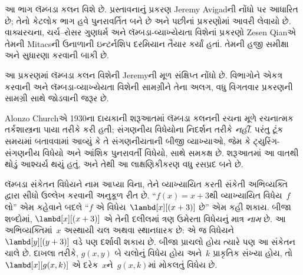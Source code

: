 
\label{guunit:OLP-0341}


\begin{editorial}
આ ભાગ લૅમ્બડા કલન વિશે છે. પ્રસ્તાવનાનું પ્રકરણ Jeremy Avigadની
નોંધો પર આધારિત છે; તેનો કેટલોક ભાગ હવે પુનરાવર્તિત બને છે અને પછીનાં
પ્રકરણોમાં આવરી લેવાયો છે. વાક્યરચના, ચર્ચ--રોસર ગુણધર્મ અને
લૅમ્બડા-વ્યાખ્યેયતા વિશેનાં પ્રકરણો Zesen Qianએ તેમની Mitacsની
ઉનાળાની ઇન્ટર્નશિપ દરમિયાન તૈયાર કર્યાં હતાં. તેમની હજી સમીક્ષા
અને સુધારણા કરવાની બાકી છે.
\end{editorial}

\begingroup
\makeatletter{}\makeatother

\label{guunit:OLP-0342}


\begin{editorial}
આ પ્રકરણમાં લૅમ્બડા કલન વિશેની Jeremyની મૂળ સંક્ષિપ્ત નોંધો છે.
વિભાગોને એકત્ર કરવાની અને લૅમ્બડા-વ્યાખ્યેયતા વિશેની સામગ્રીને
તેના અલગ, વધુ વિગતવાર પ્રકરણની સામગ્રી સાથે જોડવાની જરૂર છે.
\end{editorial}

\begingroup
\makeatletter{}\makeatother

\label{guunit:OLP-0343}


Alonzo Churchએ 1930ના દાયકાની શરૂઆતમાં લૅમ્બડા કલનની રચના મૂળે
રચનાત્મક તર્કશાસ્ત્રના પાયા તરીકે કરી હતી; સંગણનીય વિધેયોના
નિદર્શન તરીકે \emph{નહીં}. પરંતુ ટૂંક સમયમાં બતાવવામાં આવ્યું કે
તે સંગણનીયતાની બીજી વ્યાખ્યાઓ, જેમ કે ટ્યુરિંગ-સંગણનીય વિધેયો
અને આંશિક પુનરાવર્તી વિધેયો, સાથે સમકક્ષ છે. શરૂઆતમાં આ વાતથી
થોડું આશ્ચર્ય થયું હતું, અને તેથી આ લાક્ષણિકીકરણ વધુ રસપ્રદ બને છે.

લૅમ્બડા સંકેતન વિધેયને નામ આપ્યા વિના, તેને વ્યાખ્યાયિત કરતી
સંકેતી અભિવ્યક્તિ દ્વારા સીધો ઉલ્લેખ કરવાની અનુકૂળ રીત છે.
``$f(x) = x + 3$થી વ્યાખ્યાયિત વિધેય~$f$ લો'' એમ કહેવાને બદલે
``$f$ એ વિધેય~$\lambd[x][(x + 3)]$ છે'' એમ કહી શકાય. બીજા શબ્દોમાં,
$\lambd[x][(x+3)]$ એ તેની દલીલમાં ત્રણ ઉમેરતા વિધેયનું માત્ર
\emph{નામ} છે. આ અભિવ્યક્તિમાં~$x$ અસ્થાયી ચલ અથવા સ્થાનધારક છે:
એ જ વિધેયને $\lambd[y][(y + 3)]$ વડે પણ દર્શાવી શકાય છે. બીજા
પ્રાચલો હોય ત્યારે પણ આ સંકેતન ચાલે છે. દાખલા તરીકે,
$g(x, y)$ બે ચલોનું વિધેય હોય અને~$k$ પ્રાકૃતિક સંખ્યા હોય,
તો~$\lambd[x][g(x,k)]$ એ દરેક~$x$ને~$g(x, k)$માં મોકલતું વિધેય છે.


